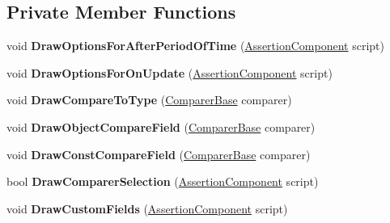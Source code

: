 \subsection*{Private Member Functions}
\begin{DoxyCompactItemize}
\item 
\mbox{\label{class_unity_test_1_1_assertion_component_editor_a88d62c2477640574ed47f5facdbed2dc}} 
void {\bfseries Draw\+Options\+For\+After\+Period\+Of\+Time} (\hyperlink{class_unity_test_1_1_assertion_component}{Assertion\+Component} script)
\item 
\mbox{\label{class_unity_test_1_1_assertion_component_editor_a568dfa0d3b0fbc10fb5ab5d137182f3d}} 
void {\bfseries Draw\+Options\+For\+On\+Update} (\hyperlink{class_unity_test_1_1_assertion_component}{Assertion\+Component} script)
\item 
\mbox{\label{class_unity_test_1_1_assertion_component_editor_a4fdf186d0d75d15ecab537a585ce4169}} 
void {\bfseries Draw\+Compare\+To\+Type} (\hyperlink{class_unity_test_1_1_comparer_base}{Comparer\+Base} comparer)
\item 
\mbox{\label{class_unity_test_1_1_assertion_component_editor_a9ef9211ec6f3dee4843d8a1e8fbc75d4}} 
void {\bfseries Draw\+Object\+Compare\+Field} (\hyperlink{class_unity_test_1_1_comparer_base}{Comparer\+Base} comparer)
\item 
\mbox{\label{class_unity_test_1_1_assertion_component_editor_a8efc856f483277959a3936b0efabab41}} 
void {\bfseries Draw\+Const\+Compare\+Field} (\hyperlink{class_unity_test_1_1_comparer_base}{Comparer\+Base} comparer)
\item 
\mbox{\label{class_unity_test_1_1_assertion_component_editor_aace5997a5d8d1e6aaf95d55e9faed294}} 
bool {\bfseries Draw\+Comparer\+Selection} (\hyperlink{class_unity_test_1_1_assertion_component}{Assertion\+Component} script)
\item 
\mbox{\label{class_unity_test_1_1_assertion_component_editor_a0f11a85920692cacdf2b72f75dd892de}} 
void {\bfseries Draw\+Custom\+Fields} (\hyperlink{class_unity_test_1_1_assertion_component}{Assertion\+Component} script)
\end{DoxyCompactItemize}

